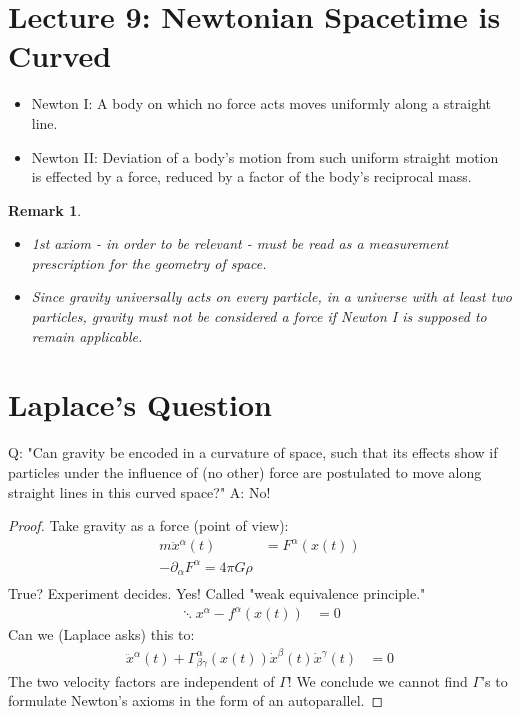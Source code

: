 \documentclass[10pt, oneside]{article}
\newtheorem{remark}{Remark}
\begin{document}
\section{Lecture 9: Newtonian Spacetime is Curved \cite{CurvedNewton}}
  \begin{itemize}
  \item Newton I: A body on which no force acts moves uniformly along a straight line.
  \item Newton II: Deviation of a body's motion from such uniform straight motion is effected by a force, reduced by a factor of the body's reciprocal mass.
  \end{itemize}
  \begin{remark}
  \begin{itemize}
  \item 1st axiom - in order to be relevant - must be read as a measurement prescription for the geometry of space.
  \item Since gravity universally acts on every particle, in a universe with at least two particles, gravity must not be considered a force if Newton I is supposed to remain applicable.
  \end{itemize}
  \end{remark}
  \section{Laplace's Question}
  Q: "Can gravity be encoded in a curvature of space, such that its effects show if particles under the influence of (no other) force are postulated to move along straight lines in this curved space?"
  A: No!
  \begin{proof}
     Take gravity as a force (point of view):
     \begin{align*}
        m \ddot{x}^\alpha (t) &= F^\alpha(x(t)) \\
        - \partial_\alpha F^\alpha = 4 \pi G \rho \\
     \end{align*}
     True?
     Experiment decides.
     Yes!
     Called "weak equivalence principle."
     \begin{align*}
        \ddots{x}^\alpha - f^\alpha(x(t)) &= 0
     \end{align*}
     Can we  (Laplace asks) this to:
     \begin{align*}
        \ddot{x}^\alpha(t) + \Gamma^\alpha_{\beta \gamma} (x(t)) \dot{x}^\beta(t) \dot{x}^\gamma (t) &= 0
     \end{align*}
     The two velocity factors are independent of $\Gamma$! We conclude we cannot find $\Gamma$'s to formulate Newton's axioms in the form of an autoparallel.
  \end{proof}
\end{document}
